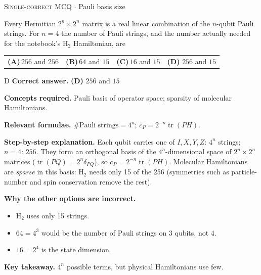 \documentclass[11pt,a4paper]{article}
\newcommand{\optlabel}[1]{\textbf{(#1)}}
\newcommand{\correctlabel}[1]{\textcolor{okgreen}{\textbf{(#1)}\,\ding{51}}}
\newenvironment{qitem}[1]{\begin{list}{}{\setlength{\leftmargin}{3.3em}\setlength{\labelwidth}{3.1em}%
  \setlength{\labelsep}{0.2em}\setlength{\topsep}{3pt}\setlength{\parsep}{3pt}}\item[\textbf{Q.#1}\hfill]}{\end{list}}
\newcommand{\qsep}{\par\vspace{2pt}{\color{black!15}\hrule}\vspace{4pt}}
\newcommand{\qmeta}[2]{{\footnotesize\color{black!60}\textsc{#1} \;$\cdot$\; #2}\par}
\begin{document}
\begin{qitem}{38}
\qmeta{Single-correct MCQ}{Pauli basis size}
Every Hermitian $2^n\times2^n$ matrix is a real linear combination of the $n$-qubit Pauli strings. For $n = 4$ the number of Pauli strings,
and the number actually needed for the notebook's H$_2$ Hamiltonian, are
\par\smallskip\noindent\begin{tabularx}{\linewidth}{@{}*{4}{L}@{}}
\optlabel{A}\,$256$ and $256$ & \optlabel{B}\,$64$ and $15$ & \optlabel{C}\,$16$ and $15$ & \correctlabel{D}\,$256$ and $15$
\end{tabularx}
\end{qitem}
\begin{solbox}{D}
\textbf{\color{brand}Correct answer.} \textcolor{okgreen}{\textbf{(D)}} $256$ and $15$

\textbf{\color{brand}Concepts required.} Pauli basis of operator space; sparsity of molecular Hamiltonians.

\textbf{\color{brand}Relevant formulae.} $\#\text{Pauli strings} = 4^n$; $c_P = 2^{-n}\operatorname{tr}(PH)$.

\textbf{\color{brand}Step-by-step explanation.} Each qubit carries one of $I, X, Y, Z$: $4^n$ strings; $n = 4$: $256$. They form an orthogonal basis of the $4^n$-dimensional space of
$2^n\times2^n$ matrices ($\operatorname{tr}(PQ) = 2^n\delta_{PQ}$), so $c_P = 2^{-n}\operatorname{tr}(PH)$. Molecular Hamiltonians are \emph{sparse} in this basis:
H$_2$ needs only 15 of the 256 (symmetries such as particle-number and spin conservation remove the rest).

\textbf{\color{brand}Why the other options are incorrect.}
\begin{itemize}[leftmargin=2.4em, itemsep=1pt, topsep=2pt]
\item[\textbf{(A)}] H$_2$ uses only 15 strings.
\item[\textbf{(B)}] $64 = 4^3$ would be the number of Pauli strings on 3 qubits, not 4.
\item[\textbf{(C)}] $16 = 2^4$ is the state dimension.
\end{itemize}
\textbf{\color{brand}Key takeaway.} $4^n$ possible terms, but physical Hamiltonians use few.
\end{solbox}
\qsep
\end{document}

